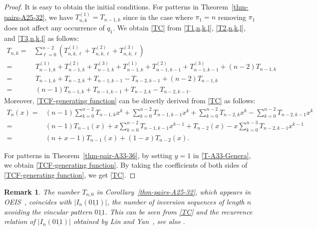 \documentclass[12pt]{article}
\newtheorem*{remark}{Remark}
\begin{document}
\begin{proof}
It is easy to obtain the initial conditions. For patterns in Theorem~\ref{thm-pairs-A25-32},  we have $T^{(1)}_{n,k}=T_{n-1,k}$ since in the case where $\pi_1=n$  removing $\pi_1$  does not affect any occurrence of $q_1$.
We obtain \eqref{TC} from \eqref{T1,n,k,l}, \eqref{T2,n,k,l}, and \eqref{T3,n,k,l} as follows:
\begin{align*}
 T_{n,k}= & \sum_{\ell=0}^{n-2}(T^{(1)}_{n,k,\ell}+T^{(2)}_{n,k,\ell}+
     T^{(3)}_{n,k,\ell})\\[6pt]
     =&\ T^{(1)}_{n-1,k} + T^{(2)}_{n-1,k}+T^{(3)}_{n-1,k}+T^{(1)}_{n-1,k} + T^{(2)}_{n-1,k-1}+T^{(3)}_{n-1,k-1}+(n-2) T_{n-1,k}\\[6pt]
     =& \ T_{n-1,k}+T_{n-2,k}+T_{n-1,k-1}-T_{n-2,k-1}+(n-2) T_{n-1,k}\\[6pt]
     =&\ (n-1)T_{n-1,k}+T_{n-1,k-1}+T_{n-2,k}-T_{n-2,k-1}. 
\end{align*}
 Moreover, \eqref{TCF-generating function} can be directly derived from \eqref{TC} as follows:
\begin{align*}
T_n(x)=& (n-1)\sum_{k=0}^{n-2} T_{n-1,k}x^k + \sum_{k=0}^{n-2} T_{n-1,k-1}x^k + \sum_{k=0}^{n-2} T_{n-2,k}x^k- \sum_{k=0}^{n-2} T_{n-2,k-1}x^k\\ 
=& (n-1) T_{n-1}(x)+ x\sum_{k=0}^{n-2} T_{n-1,k-1}x^{k-1} + T_{n-2}(x)- x\sum_{k=0}^{n-3} T_{n-2,k-1}x^{k-1}\\
=&(n+x-1)T_{n-1}(x) + (1-x) T_{n-2}(x).
\end{align*}

For patterns in Theorem~\ref{thm-pair-A33-36}, by setting $y=1$ in \eqref{T-A33-Genera}, we obtain \eqref{TCF-generating function}.
By taking the coefficients of both sides of \eqref{TCF-generating function}, 
we get \eqref{TC}. 
\end{proof}


\begin{remark} 
The number $T_{n,0}$ in Corollary~\ref{thm-pairs-A25-32}, which appears in OEIS~\cite[A102038]{OEIS}, coincides with  $|I_n(0\underline{11})|$, the number of inversion sequences of length $n$ avoiding the vincular pattern $0\underline{11}$.
This can be seen from \eqref{TC} and the recurrence relation of $|I_n(0\underline{11})|$ obtained by Lin and Yan~\cite[Theorem~2.3]{Lin-Yan},  see also \cite[Table~2]{JS}. 
\end{remark}
\end{document}

